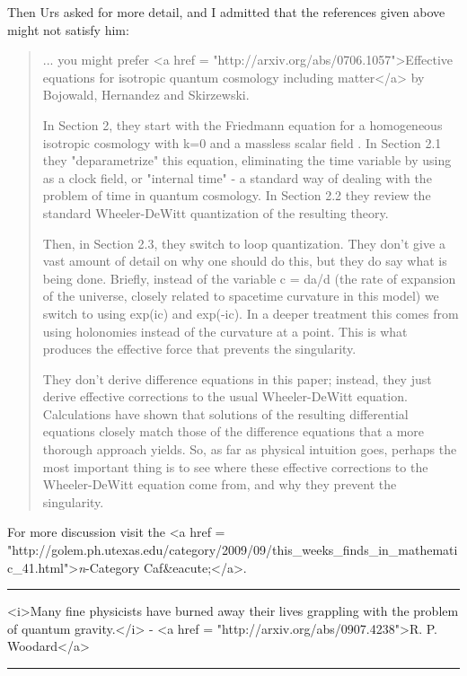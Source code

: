 Then Urs asked for more detail, and I admitted that the references
given above might not satisfy him:

\begin{quote}
... you might prefer <a href =
"http://arxiv.org/abs/0706.1057">Effective equations for
isotropic quantum cosmology including matter</a> by Bojowald,
Hernandez and Skirzewski.

In Section 2, they start with the Friedmann equation for a homogeneous
isotropic cosmology with k=0 and a massless scalar field \phi .  In
Section 2.1 they "deparametrize" this equation, eliminating the time
variable by using \phi  as a clock field, or "internal time" - a standard
way of dealing with the problem of time in quantum cosmology.  In
Section 2.2 they review the standard Wheeler-DeWitt quantization of
the resulting theory.

Then, in Section 2.3, they switch to loop quantization.  They don't
give a vast amount of detail on why one should do this, but they do
say what is being done.  Briefly, instead of the variable c = da/d\tau 
(the rate of expansion of the universe, closely related to spacetime
curvature in this model) we switch to using exp(ic) and exp(-ic).  In
a deeper treatment this comes from using holonomies instead of the
curvature at a point.  This is what produces the effective force that
prevents the singularity.

They don't derive difference equations in this paper; instead, they
just derive effective corrections to the usual Wheeler-DeWitt
equation.  Calculations have shown that solutions of the resulting
differential equations closely match those of the difference equations
that a more thorough approach yields.  So, as far as physical
intuition goes, perhaps the most important thing is to see where these
effective corrections to the Wheeler-DeWitt equation come from, and
why they prevent the singularity.
\end{quote}

For more discussion visit the <a href =
"http://golem.ph.utexas.edu/category/2009/09/this_weeks_finds_in_mathematic_41.html">\emph{n}-Category
Caf&eacute;</a>.

\par\noindent\rule{\textwidth}{0.4pt}

<i>Many fine physicists have burned away their lives grappling with
the problem of quantum gravity.</i> - <a href =
"http://arxiv.org/abs/0907.4238">R. P. Woodard</a>

\par\noindent\rule{\textwidth}{0.4pt}

